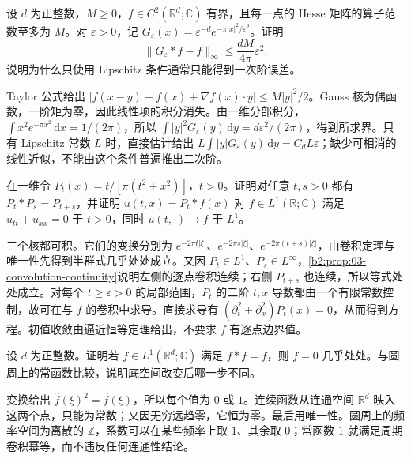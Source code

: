 \begin{exercise}\label{b2:ex:03-gaussian-error}
设 \(d\) 为正整数，\(M\geq0\)，\(f\in C^2(\mathbb R^d;\mathbb C)\) 有界，且每一点的 Hesse 矩阵的算子范数至多为 \(M\)。对 \(\varepsilon>0\)，记 \(G_\varepsilon(x)=\varepsilon^{-d}e^{-\pi|x|^2/\varepsilon^2}\)。证明
\[
 \|G_\varepsilon*f-f\|_\infty\leq\dfrac{dM}{4\pi}\varepsilon^2.
\]
说明为什么只使用 Lipschitz 条件通常只能得到一次阶误差。
\end{exercise}
\begin{solution}
Taylor 公式给出 \(|f(x-y)-f(x)+\nabla f(x)\cdot y|\leq M|y|^2/2\)。Gauss 核为偶函数，一阶矩为零，因此线性项的积分消失。由一维分部积分，\(\int x^2e^{-\pi x^2}\,\mathrm{d}x=1/(2\pi)\)，所以 \(\int|y|^2G_\varepsilon(y)\,\mathrm{d}y=d\varepsilon^2/(2\pi)\)，得到所求界。只有 Lipschitz 常数 \(L\) 时，直接估计给出 \(L\int|y|G_\varepsilon(y)\,\mathrm{d}y=C_dL\varepsilon\)；缺少可相消的线性近似，不能由这个条件普遍推出二次阶。
\end{solution}

\begin{exercise}\label{b2:ex:03-poisson-semigroup}
在一维令 \(P_t(x)=t/[\pi(t^2+x^2)]\)，\(t>0\)。证明对任意 \(t,s>0\) 都有 \(P_t*P_s=P_{t+s}\)，并证明 \(u(t,x)=P_t*f(x)\) 对 \(f\in L^1(\mathbb R;\mathbb C)\) 满足 \(u_{tt}+u_{xx}=0\) 于 \(t>0\)，同时 \(u(t,\cdot)\to f\) 于 \(L^1\)。
\end{exercise}
\begin{solution}
三个核都可积。它们的变换分别为 \(e^{-2\pi t|\xi|}\)、\(e^{-2\pi s|\xi|}\)、\(e^{-2\pi(t+s)|\xi|}\)，由卷积定理与唯一性先得到半群式几乎处处成立。又因 \(P_t\in L^1\)、\(P_s\in L^\infty\)，\cref{b2:prop:03-convolution-continuity}说明左侧的逐点卷积连续；右侧 \(P_{t+s}\) 也连续，所以等式处处成立。对每个 \(t\geq\varepsilon>0\) 的局部范围，\(P_t\) 的二阶 \(t,x\) 导数都由一个有限常数控制，故可在与 \(f\) 的卷积中求导。直接求导有 \((\partial_t^2+\partial_x^2)P_t(x)=0\)，从而得到方程。初值收敛由逼近恒等定理给出，不要求 \(f\) 有逐点边界值。
\end{solution}

\begin{exercise}\label{b2:ex:03-idempotent}
设 \(d\) 为正整数。证明若 \(f\in L^1(\mathbb R^d;\mathbb C)\) 满足 \(f*f=f\)，则 \(f=0\) 几乎处处。与圆周上的常函数比较，说明底空间改变后哪一步不同。
\end{exercise}
\begin{solution}
变换给出 \(\widehat f(\xi)^2=\widehat f(\xi)\)，所以每个值为 \(0\) 或 \(1\)。连续函数从连通空间 \(\mathbb R^d\) 映入这两个点，只能为常数；又因无穷远趋零，它恒为零。最后用唯一性。圆周上的频率空间为离散的 \(\mathbb Z\)，系数可以在某些频率上取 \(1\)、其余取 \(0\)；常函数 \(1\) 就满足周期卷积幂等，而不违反任何连通性结论。
\end{solution}

